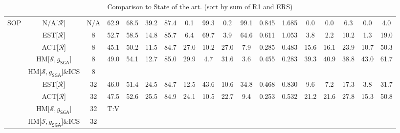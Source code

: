 \begin{table*}
{\begin{tabular}{c|cc|cccc|ccccc|ccccc|c}
\multirow{9}{*}{SOP} & N/A{[}$\mathcal{R}${]} & N/A & 62.9 & 68.5 & 39.2 & 87.4 & 0.1 & 99.3 & 0.2 & 99.1 & 0.845 & 1.685 & 0.0 & 0.0 & 6.3 & 0.0 & 4.0\tabularnewline
\cline{2-18} \cline{3-18} \cline{4-18} \cline{5-18} \cline{6-18} \cline{7-18} \cline{8-18} \cline{9-18} \cline{10-18} \cline{11-18} \cline{12-18} \cline{13-18} \cline{14-18} \cline{15-18} \cline{16-18} \cline{17-18} \cline{18-18}
 & EST{[}$\mathcal{R}${]} & 8 & 52.7 & 58.5 & 14.8 & 85.7 & 6.4 & 69.7 & 3.9 & 64.6 & 0.611 & 1.053 & 3.8 & 2.2 & 10.2 & 1.3 & 19.0\tabularnewline
 & ACT{[}$\mathcal{R}${]} & 8 & 45.1 & 50.2 & 11.5 & 84.7 & 27.0 & 10.2 & 27.0 & 7.9 & 0.285 & 0.483 & 15.6 & 16.1 & 23.9 & 10.7 & 50.3\tabularnewline
 & HM{[}$\mathcal{S},g_{\mathsf{SGA}}${]} & 8 & 49.0 & 54.1 & 12.7 & 85.0 & 29.9 & 4.7 & 31.6 & 3.6 & 0.455 & 0.283 & 39.3 & 40.9 & 38.8 & 43.0 & 61.7\tabularnewline
 & HM{[}$\mathcal{S},g_{\mathsf{SGA}}${]}\&ICS & 8 &  &  &  &  &  &  &  &  &  &  &  &  &  &  & \tabularnewline
\cline{2-18} \cline{3-18} \cline{4-18} \cline{5-18} \cline{6-18} \cline{7-18} \cline{8-18} \cline{9-18} \cline{10-18} \cline{11-18} \cline{12-18} \cline{13-18} \cline{14-18} \cline{15-18} \cline{16-18} \cline{17-18} \cline{18-18}
 & EST{[}$\mathcal{R}${]} & 32 & 46.0 & 51.4 & 24.5 & 84.7 & 12.5 & 43.6 & 10.6 & 34.8 & 0.468 & 0.830 & 9.6 & 7.2 & 17.3 & 3.8 & 31.7\tabularnewline
 & ACT{[}$\mathcal{R}${]} & 32 & 47.5 & 52.6 & 25.5 & 84.9 & 24.1 & 10.5 & 22.7 & 9.4 & 0.253 & 0.532 & 21.2 & 21.6 & 27.8 & 15.3 & 50.8\tabularnewline
 & HM{[}$\mathcal{S},g_{\mathsf{SGA}}${]} & 32 & T:V &  &  &  &  &  &  &  &  &  &  &  &  &  & \tabularnewline
 & HM{[}$\mathcal{S},g_{\mathsf{SGA}}${]}\&ICS & 32 &  &  &  &  &  &  &  &  &  &  &  &  &  &  & \tabularnewline

	\bottomrule

\end{tabular}}

\caption{Comparison to State of the art. (sort by sum of R1 and ERS)}
	\label{tab:sota}
\end{table*}
